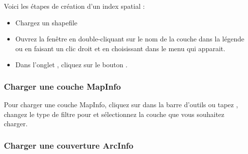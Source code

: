 Voici les \'etapes de cr\'eation d'un index spatial :

\begin{itemize}
\item Chargez un shapefile
\item Ouvrez la fen\^etre  en double-cliquant sur le nom de la couche dans la l\'egende ou en faisant un clic droit et en choisissant  dans le menu qui apparait.
\item Dans l'onglet , cliquez sur le bouton .
\end{itemize}

\subsubsection{Charger une couche MapInfo}

Pour charger une couche MapInfo, cliquez sur  dans la barre d'outils ou tapez , changez le type de filtre pour  et s\'electionnez la couche que vous souhaitez charger.

\subsubsection{Charger une couverture ArcInfo}

